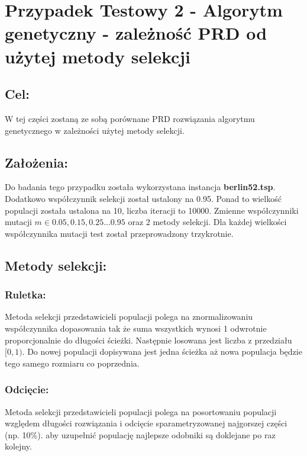 \section{Przypadek Testowy 2 - Algorytm genetyczny - zależność PRD od użytej metody selekcji}
  \subsection{Cel:}
    W tej części zostaną ze sobą porównane PRD rozwiązania algorytmu genetycznego w zależności użytej metody selekcji.
    \subsection{Założenia:}
    Do badania tego przypadku została wykorzystana instancja \textbf{berlin52.tsp}. Dodatkowo współczynnik selekcji został ustalony na 0.95. Ponad to wielkość populacji została ustalona na 10, liczba iteracji to 10000. Zmienne współczynniki mutacji \(m \in {0.05, 0.15, 0.25 ... 0.95}\) oraz 2 metody selekcji. Dla każdej wielkości współczynnika mutacji test został przeprowadzony trzykrotnie.
    \subsection{Metody selekcji:}
    \subsubsection{Ruletka:}
    Metoda selekcji przedstawicieli populacji polega na znormalizowaniu współczynnika dopasowania tak że suma wszystkich wynosi 1 odwrotnie proporcjonalnie do długości ścieżki. Następnie losowana jest liczba z przedziału \( [0, 1)\). Do nowej populacji dopisywana jest jedna ścieżka aż nowa populacja będzie tego samego rozmiaru co poprzednia.
    \subsubsection{Odcięcie:}
    Metoda selekcji przedstawicieli populacji polega na posortowaniu populacji względem długości rozwiązania i odcięcie sparametryzowanej najgorszej części (np. 10\%). aby uzupełnić populację najlepsze odobniki są doklejane po raz kolejny.
